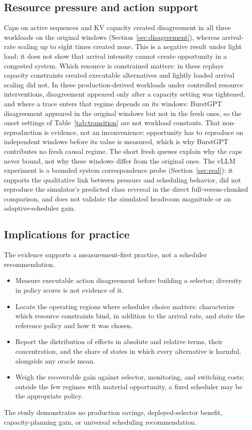 \documentclass[preprint,12pt]{elsarticle}
\begin{document}
\subsection{Resource pressure and action support}
Caps on active sequences and KV capacity created disagreement in all three
workloads on the original windows (Section~\ref{sec:disagreement}), whereas
arrival-rate scaling up to eight times created none. This is a negative result
under light load: it does not show that arrival intensity cannot create
opportunity in a congested system. Which resource is constrained
matters: in these replays capacity constraints created executable alternatives
and lightly loaded arrival scaling did not. In these
production-derived workloads under controlled resource interventions,
disagreement appeared only after a capacity setting was tightened, and where a
trace enters that regime depends on its windows: BurstGPT disagreement appeared
in the original windows but not in the fresh ones, so the onset settings of
Table~\ref{tab:transition} are not workload constants. That non-reproduction is
evidence, not an inconvenience: opportunity has to reproduce on independent
windows before its value is measured, which is why BurstGPT contributes no fresh
causal regime. The short fresh queues explain why the caps never bound, not why
these windows differ from the original ones. The vLLM experiment is a
bounded system correspondence probe (Section~\ref{sec:real}): it supports the
qualitative link between pressure and scheduling behavior, did not reproduce
the simulator's predicted class reversal in the direct full-versus-chunked
comparison, and does not validate the simulated headroom magnitude or an
adaptive-scheduler gain.

\subsection{Implications for practice}
The evidence supports a measurement-first practice, not a scheduler
recommendation.
\begin{itemize}
  \item Measure executable action disagreement before building a selector;
  diversity in policy scores is not evidence of it.
  \item Locate the operating regions where scheduler choice matters: characterize
  which resource constraints bind, in addition to the arrival rate, and state the
  reference policy and how it was chosen.
  \item Report the distribution of effects in absolute and relative terms, their
  concentration, and the share of states in which every alternative is harmful,
  alongside any oracle mean.
  \item Weigh the recoverable gain against selector, monitoring, and switching
  costs; outside the few regimes with material opportunity, a fixed scheduler may
  be the appropriate policy.
\end{itemize}
The study demonstrates no production savings, deployed-selector benefit,
capacity-planning gain, or universal scheduling recommendation.
\end{document}
